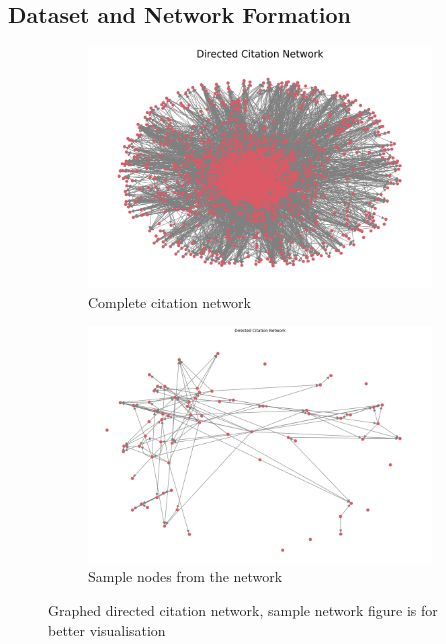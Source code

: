 \documentclass{article}
\begin{document}
\subsection{Dataset and Network Formation}
\begin{figure}[h]
\centering
\begin{subfigure}[b]{0.40\textwidth}
    \centering
    \includegraphics[width=\textwidth]{Figures/Network Graph.png}
    \caption{Complete citation network}
    \label{fig:network_graph}
\end{subfigure}
\hfill
\begin{subfigure}[b]{0.40\textwidth}
    \centering
    \includegraphics[width=\textwidth]{Figures/sample network.png}
    \caption{Sample nodes from the network}
    \label{fig:sample_network}
\end{subfigure}
\caption{Graphed directed citation network, sample network figure is for better visualisation}
\label{fig:combined}
\end{figure}
\end{document}

